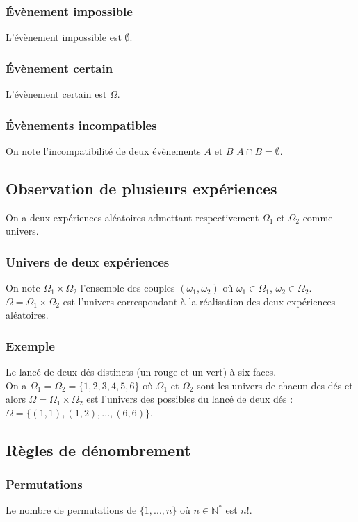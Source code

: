 \documentclass[a4paper,10pt]{book} %
\newcommand{\N}{\mathbb{N}}
\begin{document}
\subsubsection{Évènement impossible}
L'évènement impossible est $\emptyset$.

\subsubsection{Évènement certain}
L'évènement certain est $\Omega$.

\subsubsection{Évènements incompatibles}
On note l'incompatibilité de deux évènements $A$ et $B$ $A\cap B=\emptyset$.

\subsection{Observation de plusieurs expériences}
On a deux expériences aléatoires admettant respectivement $\Omega_1$ et $\Omega_2$ comme univers.

\subsubsection{Univers de deux expériences}
On note $\Omega_1\times \Omega_2$ l'ensemble des couples $(\omega_1,\omega_2)$ où $\omega_1\in \Omega_1$, $\omega_2\in\Omega_2$.\\

$\Omega=\Omega_1\times\Omega_2$ est l'univers correspondant à la réalisation des deux expériences aléatoires.

\subsubsection{Exemple}
Le lancé de deux dés distincts (un rouge et un vert) à six faces.\\

On a $\Omega_1=\Omega_2=\{1,2,3,4,5,6\}$ où $\Omega_1$ et $\Omega_2$ sont les univers de chacun des dés et alors $\Omega=\Omega_1\times \Omega_2$ est l'univers des possibles du lancé de deux dés : $\Omega=\{(1,1),(1,2),...,(6,6)\}$.

\subsection{Règles de dénombrement}
\subsubsection{Permutations}
Le nombre de permutations de $\{1,...,n\}$ où $n\in \N^*$ est $n!$.\\
\end{document}

